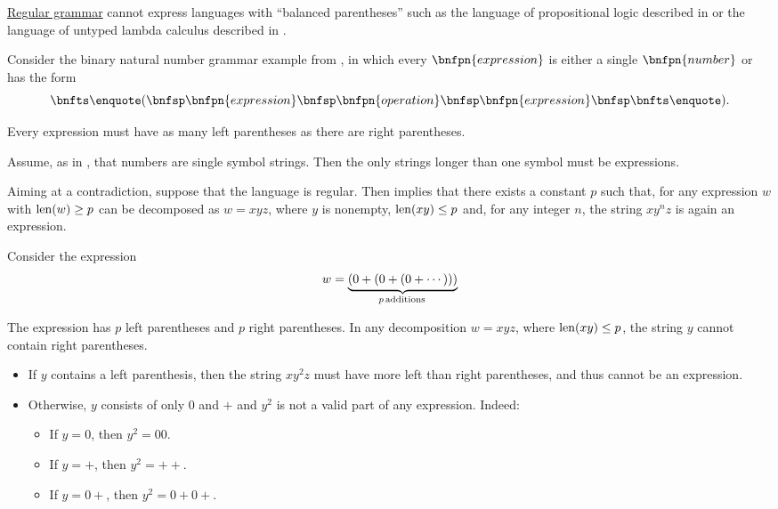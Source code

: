 \begin{example}
\begin{thmenum}
     \hyperref[def:chomsky_hierarchy/regular]{Regular grammar} cannot express languages with \enquote{balanced parentheses} such as the language of propositional logic described in  or the language of untyped lambda calculus described in .

    Consider the binary natural number grammar example from , in which every \( \bnfpn{expression} \) is either a single \( \bnfpn{number} \) or has the form
    \begin{equation*}
      \bnftsq{(} \bnfsp \bnfpn{expression} \bnfsp \bnfpn{operation} \bnfsp \bnfpn{expression} \bnfsp \bnftsq{)}.
    \end{equation*}

    Every expression must have as many left parentheses as there are right parentheses.

    Assume, as in , that numbers are single symbol strings. Then the only strings longer than one symbol must be expressions.

    Aiming at a contradiction, suppose that the language is regular. Then  implies that there exists a constant \( p \) such that, for any expression \( w \) with \( \operatorname{len}(w) \geq p \) can be decomposed as \( w = x y z \), where \( y \) is nonempty, \( \operatorname{len}(xy) \leq p \) and, for any  integer \( n \), the string \( x y^n z \) is again an expression.

    Consider the expression
    \begin{equation*}
      w = \underbrace{(0 + (0 + (0 + \cdots)))}_{p \T*{additions}}
    \end{equation*}

    The expression has \( p \) left parentheses and \( p \) right parentheses. In any decomposition \( w = xyz \), where \( \operatorname{len}(xy) \leq p \), the string \( y \) cannot contain right parentheses.
    \begin{itemize}
      \item If \( y \) contains a left parenthesis, then the string \( x y^2 z \) must have more left than right parentheses, and thus cannot be an expression.

      \item Otherwise, \( y \) consists of only \( 0 \) and \( + \) and \( y^2 \) is not a valid part of any expression. Indeed:
      \begin{itemize}
        \item If \( y = 0 \), then \( y^2 = 00 \).

        \item If \( y = + \), then \( y^2 = ++ \).

        \item If \( y = 0+ \), then \( y^2 = 0+0+ \).
      \end{itemize}
    \end{itemize}
  \end{thmenum}
\end{example}
